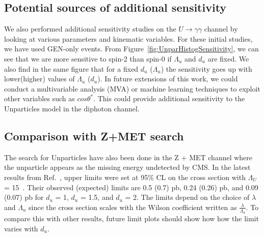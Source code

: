 \subsection{Potential sources of additional sensitivity}

We also performed additional sensitivity studies on the $U\rightarrow \gamma\gamma$ channel by looking at various parameters and kinematic variables. For these initial studies, we have used GEN-only events. From Figure~\ref{fig:UnparHistogSensitivity}, we can see that we are more sensitive to spin-2 than spin-0 if $\Lambda_u$ and $d_{u}$ are fixed.  
We also find in the same figure that for a fixed $d_{u}$ ($\Lambda_{u}$) the sensitivity goes up with lower(higher) values of $\Lambda_{u}$ ($d_{u}$). In future extensions of this work, we could conduct a multivariable analysis (MVA) or machine learning techniques to exploit other variables such as $cos\theta^*$. This could provide additional sensitivity to the Unparticles model in the diphoton channel.

\subsection{Comparison with Z+MET search}

The search for Unparticles have also been done in the Z + MET channel where the unparticle appears as the missing energy undetected by CMS. In the latest results from Ref.~\cite{CMS:2020ulv}, upper limits were set at 95\% CL on the cross section with $\Lambda_U$ = 15~\TeV. Their observed (expected) limits are 0.5 (0.7) pb, 0.24
(0.26) pb, and 0.09 (0.07) pb for $d_u$ = 1, $d_u$ = 1.5, and $d_u$ = 2. The limits depend on the choice of $\lambda$ and $\Lambda_{u}$ since the cross section scales with the Wilson coefficient written as $\frac{\lambda}{\Lambda_{u}}$. To compare this with other results, future limit plots should show how how the limit varies with $d_u$. 








